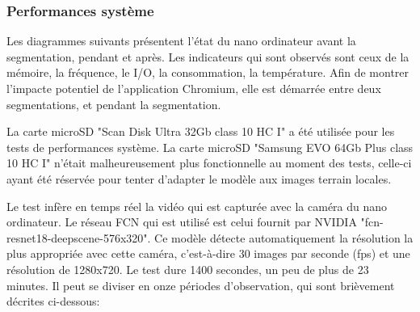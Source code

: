 \subsubsection{Performances système}
\par Les diagrammes suivants présentent l'état du nano ordinateur avant la segmentation, pendant et après. Les indicateurs qui sont observés sont ceux de la mémoire, la fréquence, le I/O, la consommation, la température. Afin de montrer l'impacte potentiel de l'application Chromium, elle est démarrée entre deux segmentations, et pendant la segmentation. 
\par La carte microSD "Scan Disk Ultra 32Gb class 10 HC I" a été utilisée pour les tests de performances système. La carte microSD "Samsung EVO 64Gb Plus class 10 HC I" n'était malheureusement plus fonctionnelle au moment des tests, celle-ci ayant été réservée pour tenter d'adapter le modèle aux images terrain locales. 
\par Le test infère en temps réel la vidéo qui est capturée avec la caméra du nano ordinateur. Le réseau FCN qui est utilisé est celui fournit par NVIDIA "fcn-resnet18-deepscene-576x320". Ce modèle détecte automatiquement la résolution la plus appropriée avec cette caméra, c'est-à-dire 30 images par seconde (\acrshort{fps}) et une résolution de 1280x720. Le test dure 1400 secondes, un peu de plus de 23 minutes. Il peut se diviser en onze périodes d'observation, qui sont brièvement décrites ci-dessous: 
